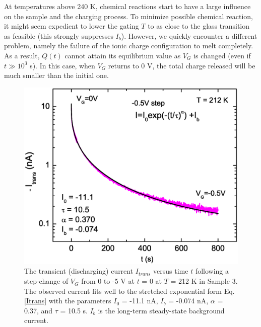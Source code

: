 At temperatures above 240 K, chemical reactions start to have a large influence on the sample and the charging process. To minimize possible chemical reaction, it might seem expedient to lower the gating $T$ to as close to 
the glass transition as feasible (this strongly suppresses $I_b$). 
However, we quickly encounter a different problem, namely the failure of
the ionic charge configuration to melt completely. As a result, $Q(t)$ cannot attain
its equilibrium value as $V_G$ is changed (even if $t\gg 10^3$ s). In this case, when $V_G$ returns to 0 V, the total charge released will be much smaller than the initial one.

\begin{figure}[!htbp]
  \begin{center}
\includegraphics[width=0.65\linewidth]{ch-appendicies/figures/FigTransCurrent.eps}
\caption{\label{figtrans} 
The transient (discharging) current $I_{trans}$ versus time $t$ following a step-change of
$V_G$ from 0 to -5 V at $t$ = 0 at $T$ = 212 K in Sample 3. The observed current fits well to the stretched exponential form
Eq. \ref{Itrans} with the parameters $I_0$ = -11.1 nA, $I_b$ = -0.074 nA, $\alpha$ = 0.37, and $\tau$ = 10.5 s.
$I_b$ is the long-term steady-state background current. 
}
  \end{center}
\end{figure} 


